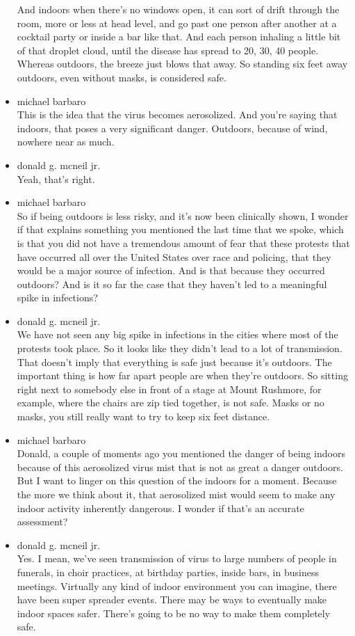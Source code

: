 \begin{itemize}
  And indoors when there's no windows open, it can sort of drift through
  the room, more or less at head level, and go past one person after
  another at a cocktail party or inside a bar like that. And each person
  inhaling a little bit of that droplet cloud, until the disease has
  spread to 20, 30, 40 people. Whereas outdoors, the breeze just blows
  that away. So standing six feet away outdoors, even without masks, is
  considered safe.
\item
  michael barbaro\\
  This is the idea that the virus becomes aerosolized. And you're saying
  that indoors, that poses a very significant danger. Outdoors, because
  of wind, nowhere near as much.
\item
  donald g. mcneil jr.\\
  Yeah, that's right.
\item
  michael barbaro\\
  So if being outdoors is less risky, and it's now been clinically
  shown, I wonder if that explains something you mentioned the last time
  that we spoke, which is that you did not have a tremendous amount of
  fear that these protests that have occurred all over the United States
  over race and policing, that they would be a major source of
  infection. And is that because they occurred outdoors? And is it so
  far the case that they haven't led to a meaningful spike in
  infections?
\item
  donald g. mcneil jr.\\
  We have not seen any big spike in infections in the cities where most
  of the protests took place. So it looks like they didn't lead to a lot
  of transmission. That doesn't imply that everything is safe just
  because it's outdoors. The important thing is how far apart people are
  when they're outdoors. So sitting right next to somebody else in front
  of a stage at Mount Rushmore, for example, where the chairs are zip
  tied together, is not safe. Masks or no masks, you still really want
  to try to keep six feet distance.
\item
  michael barbaro\\
  Donald, a couple of moments ago you mentioned the danger of being
  indoors because of this aerosolized virus mist that is not as great a
  danger outdoors. But I want to linger on this question of the indoors
  for a moment. Because the more we think about it, that aerosolized
  mist would seem to make any indoor activity inherently dangerous. I
  wonder if that's an accurate assessment?
\item
  donald g. mcneil jr.\\
  Yes. I mean, we've seen transmission of virus to large numbers of
  people in funerals, in choir practices, at birthday parties, inside
  bars, in business meetings. Virtually any kind of indoor environment
  you can imagine, there have been super spreader events. There may be
  ways to eventually make indoor spaces safer. There's going to be no
  way to make them completely safe.


\end{itemize}
